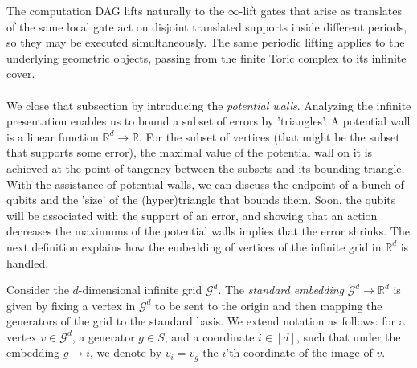 The computation DAG lifts naturally to the $\infty$-lift gates that arise as translates of the same local gate act on disjoint translated supports inside different periods, so they may be executed simultaneously. The same periodic lifting applies to the underlying geometric objects, passing from the finite Toric complex to its infinite cover.

\paragraph{}
We close that subsection by introducing the \textit{potential walls}. Analyzing the infinite presentation enables us to bound a subset of errors by 'triangles'. A potential wall is a linear function $\mathbb{R}^{d} \rightarrow \mathbb{R}$. For the subset of vertices (that might be the subset that supports some error), the maximal value of the potential wall on it is achieved at the point of tangency between the subsets and its bounding triangle. With the assistance of potential walls, we can discuss the endpoint of a bunch of qubits and the 'size' of the (hyper)triangle that bounds them. Soon, the qubits will be associated with the support of an error, and showing that an action decreases the maximums of the potential walls implies that the error shrinks. 
The next definition explains how the embedding of vertices of the infinite grid in $\mathbb{R}^{d}$ is handled.
\begin{definition}
  Consider the $d$-dimensional infinite grid $\mathcal{G}^{d}$. The \textit{standard embedding} $\mathcal{G}^{d} \rightarrow \mathbb{R}^{d}$ is given by fixing a vertex in $\mathcal{G}^{d}$ to be sent to the origin and then mapping the generators of the grid to the standard basis. We extend notation as follows: for a vertex $v \in \mathcal{G}^{d}$, a generator $g \in S$, and a coordinate $i \in [d]$, such that under the embedding $g \rightarrow i$, we denote by $v_{i} = v_{g}$ the $i$'th coordinate of the image of $v$.
\end{definition}


